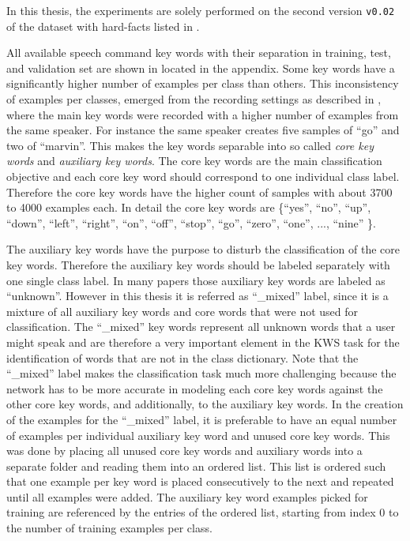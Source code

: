 In this thesis, the experiments are solely performed on the second version \texttt{v0.02} of the dataset with hard-facts listed in .

All available speech command key words with their separation in training, test, and validation set are shown in  located in the appendix.
Some key words have a significantly higher number of examples per class than others.
This inconsistency of examples per classes, emerged from the recording settings as described in \cite{Warden2018}, where the main key words were recorded with a higher number of examples from the same speaker.
For instance the same speaker creates five samples of \enquote{go} and two of \enquote{marvin}.
This makes the key words separable into so called \emph{core key words} and \emph{auxiliary key words}.
The core key words are the main classification objective and each core key word should correspond to one individual class label.
Therefore the core key words have the higher count of samples with about 3700 to 4000 examples each.
In detail the core key words are \{\enquote{yes}, \enquote{no}, \enquote{up}, \enquote{down}, \enquote{left}, \enquote{right}, \enquote{on}, \enquote{off}, \enquote{stop}, \enquote{go}, \enquote{zero}, \enquote{one}, ..., \enquote{nine} \}.

The auxiliary key words have the purpose to disturb the classification of the core key words.
Therefore the auxiliary key words should be labeled separately with one single class label.
In many papers those auxiliary key words are labeled as \enquote{unknown}.
However in this thesis it is referred as \enquote{\_mixed} label, since it is a mixture of all auxiliary key words and core words that were not used for classification.
The \enquote{\_mixed} key words represent all unknown words that a user might speak and are therefore a very important element in the KWS task for the identification of words that are not in the class dictionary.
Note that the \enquote{\_mixed} label makes the classification task much more challenging because the network has to be more accurate in modeling each core key words against the other core key words, and additionally, to the auxiliary key words.
In the creation of the examples for the \enquote{\_mixed} label, it is preferable to have an equal number of examples per individual auxiliary key word and unused core key words.
This was done by placing all unused core key words and auxiliary words into a separate folder and reading them into an ordered list.
This list is ordered such that one example per key word is placed consecutively to the next and repeated until all examples were added.
The auxiliary key word examples picked for training are referenced by the entries of the ordered list, starting from index 0 to the number of training examples per class.

